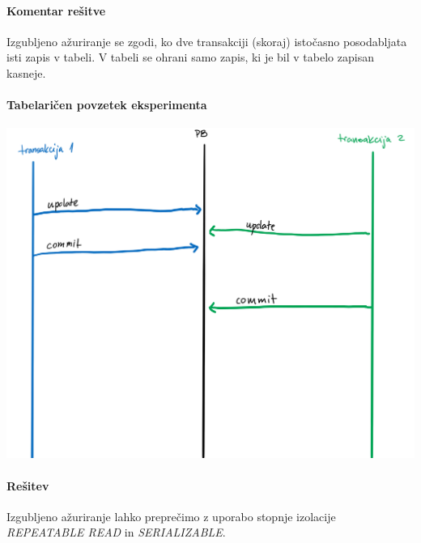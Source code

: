 \documentclass[a4paper,11pt]{report}
\begin{document}
\paragraph{Komentar rešitve}
Izgubljeno ažuriranje se zgodi, ko dve transakciji (skoraj) istočasno posodabljata isti zapis v tabeli. V tabeli se ohrani samo zapis, ki je bil v tabelo zapisan kasneje.
\pagebreak
\paragraph{Tabelaričen povzetek eksperimenta}\mbox{}

\noindent\includegraphics[width=\linewidth]{./pics/izgubljeno_azuriranje.png}

\paragraph{Rešitev}
Izgubljeno ažuriranje lahko preprečimo z uporabo stopnje izolacije \textit{REPEATABLE READ} in \textit{SERIALIZABLE}.
\end{document}
